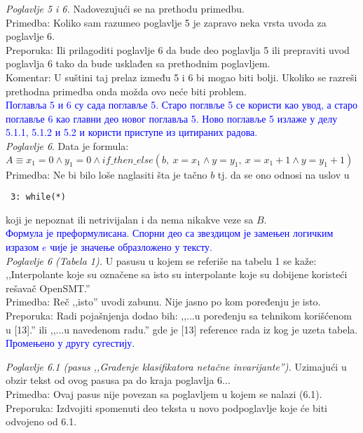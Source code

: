 \documentclass[a4paper]{report}
\newcommand{\odgovor}[1]{\textcolor{blue}{#1}}
\begin{document}
\textit{Poglavlje 5 i 6.} Nadovezujući se na prethodu primedbu. \\
\indent Primedba: Koliko sam razumeo poglavlje 5 je zapravo neka vrsta uvoda za poglavlje 6. \\
\indent Preporuka: Ili prilagoditi poglavlje 6 da bude deo poglavlja 5 ili prepraviti uvod poglavlja 6 tako da bude usklađen sa prethodnim poglavljem. \\
\indent Komentar: U suštini taj prelaz između 5 i 6 bi mogao biti bolji. Ukoliko se razreši prethodna primedba onda možda ovo neće biti problem. \\

\odgovor{Поглавља 5 и 6 су сада поглавље 5. Старо поглвље 5 се користи као увод, а старо поглавље 6 као главни део новог поглавља 5.
    Ново поглавље 5 излаже у делу 5.1.1, 5.1.2 и 5.2 и користи приступе из цитираних радова.}\\

\textit{Poglavlje 6}. Data je formula: \\ 
$A \equiv x_1 = 0 \land y_1 = 0 \land if\_then\_else(b,\ x = x_1 \land y = y_1,\ x = x_1 + 1 \land y = y_1 + 1)$ \\
\indent Primedba: Ne bi bilo loše naglasiti šta je tačno $b$ tj. da se ono odnosi na uslov u \begin{verbatim} 3: while(*) \end{verbatim} koji je nepoznat ili netrivijalan i da nema nikakve veze sa $B$. \\

\odgovor{Формула је преформулисана. Спорни део са звездицом је замењен логичким изразом $e$ чије је значење образложено у тексту.}\\

\textit{Poglavlje 6 (Tabela 1).} U pasusu u kojem se referiše na tabelu 1 se kaže: ,,Interpolante koje su označene sa isto su interpolante koje su dobijene koristeći rešavač OpenSMT.'' \\
\indent Primedba: Reč ,,isto'' uvodi zabunu. Nije jasno po kom poređenju je isto. \\
\indent Preporuka: Radi pojašnjenja dodao bih: ,,...u poređenju sa tehnikom korišćenom u [13].'' ili ,,...u navedenom radu.'' gde je [13] reference rada iz kog je uzeta tabela. \\

\odgovor{Промењено у другу сугестију.}

\textit{Poglavlje 6.1 (pasus ,,Građenje klasifikatora netačne invarijante'').} Uzimajući u obzir tekst od ovog pasusa pa do kraja poglavlja 6... \\
\indent Primedba: Ovaj pasus nije povezan sa poglavljem u kojem se nalazi (6.1). \\
\indent Preporuka: Izdvojiti spomenuti deo teksta u novo podpoglavlje koje će biti odvojeno od 6.1. \\
\end{document}

